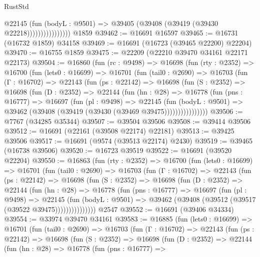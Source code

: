 \begin{lexlean}{RustStd}
\begin{coremodule}
                          @22145
                            (fun (bodyL : @9501) =>
                            @39405 (@39408 (@39419 (@39430 @22218))))))))))))))))
    @1859
@39462 := @16691 @16597
@39465 := @16731 (@16732 @1859) @34158
@39469 := @16691 (@16723 (@39465 @22200) @22204)
@39470 := @16755 @1859
@39475 := @22209 (@22210 @39470 @34161 @22171 @22173)
@39504 := @16860
    (fun (rc : @9498) =>
    @16698
      (fun (rty : @2352) =>
      @16700
        (fun (lets0 : @16699) =>
        @16701
          (fun (tail0 : @2690) =>
          @16703
            (fun (Γ : @16702) =>
            @22143
              (fun (ps : @22142) =>
              @16698
                (fun (S : @2352) =>
                @16698
                  (fun (D : @2352) =>
                  @22144
                    (fun (hn : @28) =>
                    @16778
                      (fun (pns : @16777) =>
                      @16697
                        (fun (pl : @9498) =>
                        @22145
                          (fun (bodyL : @9501) =>
                          @39462 (@39408 (@39419 (@39430 (@39469 @39475))))))))))))))))
@39506 := @7767 (@34285 @35344)
@39507 := @39504 @39506
@39508 := @39414 @39506
@39512 := @16691 (@22161 (@39508 @22174) @22181)
@39513 := @39425 @39506
@39517 := @16691 (@9574 (@39513 @22174) @2430)
@39519 := @39465 (@16738 @39506)
@39520 := @16723 @39519
@39522 := @16691 (@39520 @22204)
@39550 := @16863
    (fun (rty : @2352) =>
    @16700
      (fun (lets0 : @16699) =>
      @16701
        (fun (tail0 : @2690) =>
        @16703
          (fun (Γ : @16702) =>
          @22143
            (fun (ps : @22142) =>
            @16698
              (fun (S : @2352) =>
              @16698
                (fun (D : @2352) =>
                @22144
                  (fun (hn : @28) =>
                  @16778
                    (fun (pns : @16777) =>
                    @16697
                      (fun (pl : @9498) =>
                      @22145
                        (fun (bodyL : @9501) =>
                        @39462 (@39408 (@39512 (@39517 (@39522 @39475)))))))))))))))
    @2547
@39552 := @16691 (@39406 @34334)
@39554 := @33974 @39470 @34161
@39583 := @16885
    (fun (lets0 : @16699) =>
    @16701
      (fun (tail0 : @2690) =>
      @16703
        (fun (Γ : @16702) =>
        @22143
          (fun (ps : @22142) =>
          @16698
            (fun (S : @2352) =>
            @16698
              (fun (D : @2352) =>
              @22144
                (fun (hn : @28) =>
                @16778
                  (fun (pns : @16777) =>

\end{coremodule}
\end{lexlean}
